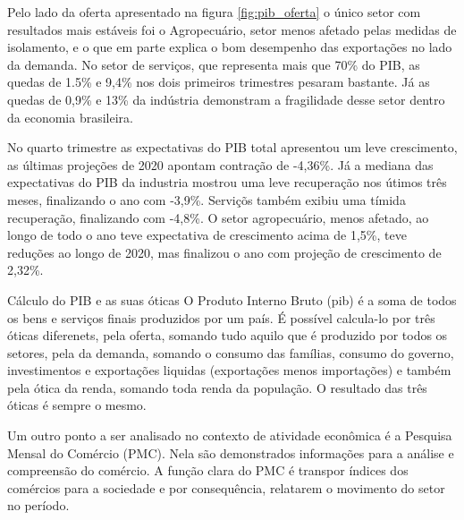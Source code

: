 \par Pelo lado da oferta apresentado na figura \ref{fig:pib_oferta} o único setor com resultados mais estáveis foi o Agropecuário, setor menos afetado pelas medidas de isolamento, e o que em parte explica o bom desempenho das exportações no lado da demanda. No setor de serviços, que representa mais que 70\% do PIB, as quedas de 1.5\% e 9,4\% nos dois primeiros trimestres pesaram bastante. Já as quedas de 0,9\% e 13\% da indústria demonstram a fragilidade desse setor dentro da economia brasileira.
\par No quarto trimestre as expectativas do PIB total apresentou um leve crescimento, as últimas projeções de 2020 apontam contração de -4,36\%. Já a mediana das expectativas do PIB da industria mostrou uma leve recuperação nos útimos três meses, finalizando o ano com -3,9\%. Serviçõs também exibiu uma tímida recuperação, finalizando com -4,8\%. O setor agropecuário, menos afetado, ao longo de todo o ano teve expectativa de crescimento acima de 1,5\%, teve reduções ao longo de 2020, mas finalizou o ano com projeção de crescimento de 2,32\%.

\begin{smbox}[label={labelbox},nameref={Cálculo do PIB e as suas óticas}]{Cálculo do PIB e as suas óticas}
	O Produto Interno Bruto (\acrshort{pib}) é a soma de todos os bens e serviços finais produzidos por um país. É possível calcula-lo por três óticas diferenets, pela oferta, somando tudo aquilo que é produzido por todos os setores, pela da demanda, somando o consumo das famílias, consumo do governo, investimentos e exportações liquidas (exportações menos importações) e também pela ótica da renda, somando toda renda da população. O resultado das três óticas é sempre o mesmo.
\end{smbox}


\par Um outro ponto a ser analisado no contexto de atividade econômica é a Pesquisa Mensal do Comércio (PMC). Nela são demonstrados informações para a análise e compreensão do comércio. A função clara do PMC é transpor índices dos comércios para a sociedade e por consequência, relatarem o movimento do setor no período.


